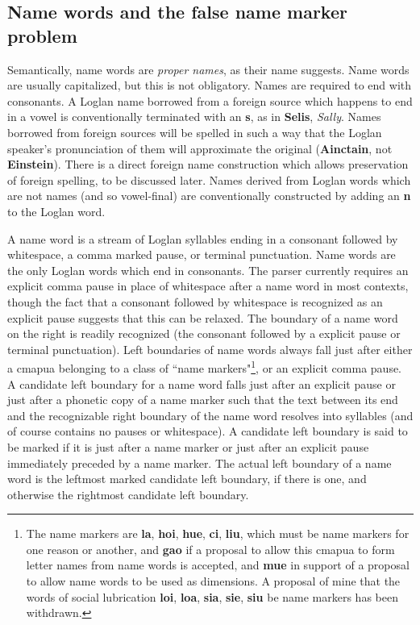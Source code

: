 \documentclass[12pt]{book}
\begin{document}
\subsection{Name words and the false name marker problem}

Semantically, name words are {\em proper names\/}, as their name suggests.  Name words are usually capitalized, but this is not obligatory.  Names are required to end with consonants.  A Loglan name borrowed from a foreign source which happens to end in a vowel is conventionally terminated with an {\bf s},
as in {\bf Selis}, {\em Sally\/}.  Names borrowed from foreign sources will be spelled in such a way that the Loglan speaker's pronunciation of them will approximate the original ({\bf Ainctain}, not {\bf Einstein}).  There is a direct foreign name construction which allows preservation of foreign spelling, to be discussed later.  Names derived from Loglan words which are not names (and so vowel-final) are conventionally constructed by adding an {\bf n} to
the Loglan word.

A name word is a stream of Loglan syllables ending in a consonant followed by whitespace, a comma marked pause, or terminal punctuation.  Name words are the only Loglan words which end in consonants.  The parser currently requires an explicit comma pause in place of whitespace after a name word in most contexts, though the fact that a consonant followed by whitespace is recognized as an explicit pause suggests that this can be relaxed.  The boundary of a name word on the right is readily recognized (the consonant followed by a explicit pause or terminal punctuation).  Left boundaries of name words always fall just after either a cmapua belonging to a class of ``name markers"\footnote{The name markers are {\bf la}, {\bf hoi}, {\bf hue}, {\bf ci}, {\bf liu}, which must be name markers for one reason or another, and {\bf gao} if a proposal to allow this cmapua to form letter names from name words is accepted, and {\bf mue} in support of a proposal to allow name words to be used as dimensions.  A proposal of mine that the words of social lubrication {\bf loi}, {\bf loa}, {\bf sia}, {\bf sie}, {\bf siu} be name markers has been withdrawn.}, or an explicit comma pause.   A candidate left boundary for a name word falls just after an explicit pause or just after a phonetic copy of a name marker such that the text between its end and the recognizable right boundary of the name word resolves into syllables (and of course contains no pauses or whitespace).   A candidate left boundary is said to be marked if it is just after a name marker  or just after an explicit pause immediately preceded by a name marker.  The actual left boundary of a name word is the leftmost marked candidate left boundary, if there is one, and otherwise the rightmost candidate left boundary.
\end{document}
